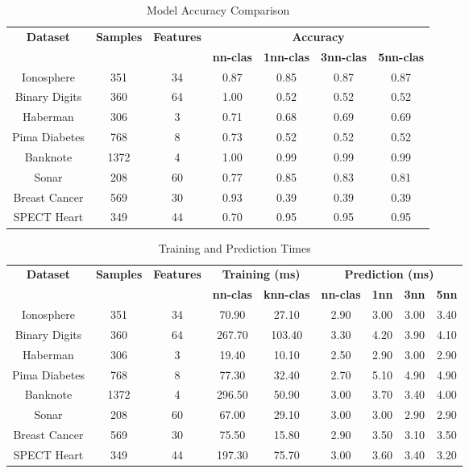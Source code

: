 \begin{table}[H]
\centering
\begin{tabular}{|c|c|c|c|c|c|c|}
\hline
\multirow{2}{*}{\textbf{Dataset}} & \multirow{2}{*}{\textbf{Samples}} & \multirow{2}{*}{\textbf{Features}} & \multicolumn{4}{c|}{\textbf{Accuracy}} \\ \cline{4-7}
 & & & \textbf{nn-clas} & \textbf{1nn-clas} & \textbf{3nn-clas} & \textbf{5nn-clas} \\ \hline
Ionosphere & 351 & 34 & 0.87 & 0.85 & 0.87 & 0.87 \\ \hline
Binary Digits & 360 & 64 & 1.00 & 0.52 & 0.52 & 0.52 \\ \hline
Haberman & 306 & 3 & 0.71 & 0.68 & 0.69 & 0.69 \\ \hline
Pima Diabetes & 768 & 8 & 0.73 & 0.52 & 0.52 & 0.52 \\ \hline
Banknote & 1372 & 4 & 1.00 & 0.99 & 0.99 & 0.99 \\ \hline
Sonar & 208 & 60 & 0.77 & 0.85 & 0.83 & 0.81 \\ \hline
Breast Cancer & 569 & 30 & 0.93 & 0.39 & 0.39 & 0.39 \\ \hline
SPECT Heart & 349 & 44 & 0.70 & 0.95 & 0.95 & 0.95 \\ \hline
\end{tabular}
\caption{Model Accuracy Comparison}
\label{tab:accuracy}
\end{table}

\begin{table}[H]
\centering
\begin{tabular}{|c|c|c|c|c|c|c|c|c|}
\hline
\multirow{2}{*}{\textbf{Dataset}} & \multirow{2}{*}{\textbf{Samples}} & \multirow{2}{*}{\textbf{Features}} & \multicolumn{2}{c|}{\textbf{Training (ms)}} & \multicolumn{4}{c|}{\textbf{Prediction (ms)}} \\ \cline{4-9}
 & & & \textbf{nn-clas} & \textbf{knn-clas} & \textbf{nn-clas} & \textbf{1nn} & \textbf{3nn} & \textbf{5nn} \\ \hline
Ionosphere & 351 & 34 & 70.90 & 27.10 & 2.90 & 3.00 & 3.00 & 3.40 \\ \hline
Binary Digits & 360 & 64 & 267.70 & 103.40 & 3.30 & 4.20 & 3.90 & 4.10 \\ \hline
Haberman & 306 & 3 & 19.40 & 10.10 & 2.50 & 2.90 & 3.00 & 2.90 \\ \hline
Pima Diabetes & 768 & 8 & 77.30 & 32.40 & 2.70 & 5.10 & 4.90 & 4.90 \\ \hline
Banknote & 1372 & 4 & 296.50 & 50.90 & 3.00 & 3.70 & 3.40 & 4.00 \\ \hline
Sonar & 208 & 60 & 67.00 & 29.10 & 3.00 & 3.00 & 2.90 & 2.90 \\ \hline
Breast Cancer & 569 & 30 & 75.50 & 15.80 & 2.90 & 3.50 & 3.10 & 3.50 \\ \hline
SPECT Heart & 349 & 44 & 197.30 & 75.70 & 3.00 & 3.60 & 3.40 & 3.20 \\ \hline
\end{tabular}
\caption{Training and Prediction Times}
\label{tab:timing}
\end{table}